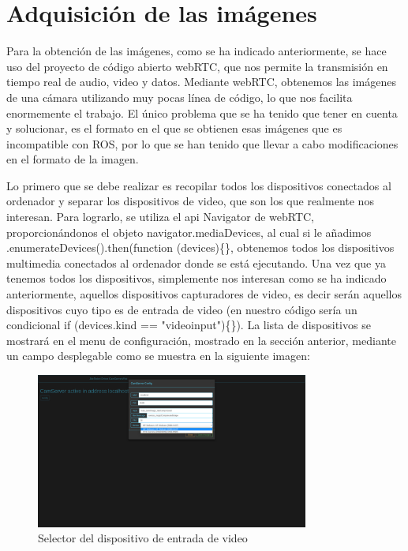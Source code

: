 \section{Adquisición de las imágenes}
Para la obtención de las imágenes, como se ha indicado anteriormente, se hace uso del proyecto de código abierto webRTC, que nos permite la transmisión en tiempo real de audio, video y datos.
Mediante webRTC, obtenemos las imágenes de una cámara utilizando muy pocas línea de código, lo que nos facilita enormemente el trabajo. El único problema que se ha tenido que tener en cuenta y solucionar, es el formato en el que se obtienen esas imágenes que es incompatible con ROS, por lo que se han tenido que llevar a cabo modificaciones en el formato de la imagen.

Lo primero que se debe realizar es recopilar todos los dispositivos conectados al ordenador y separar los dispositivos de video, que son los que realmente nos interesan. Para lograrlo, se utiliza el api Navigator de webRTC, proporcionándonos el objeto navigator.mediaDevices, al cual si le añadimos .enumerateDevices().then(function (devices)\{\}, obtenemos todos los dispositivos multimedia conectados al ordenador donde se está ejecutando. Una vez que ya tenemos todos los dispositivos, simplemente nos interesan como se ha indicado anteriormente, aquellos dispositivos capturadores de video, es decir serán aquellos dispositivos cuyo tipo es de entrada de video (en nuestro código sería un condicional if (devices.kind == "videoinput")\{\}). La lista de dispositivos se mostrará en el menu de configuración, mostrado en la sección anterior, mediante un campo desplegable como se muestra en la siguiente imagen:
 \begin{figure}[H]
  \begin{center}
    \includegraphics[width=0.8\textwidth]{figures/devicecamserver.png}
		\caption{Selector del dispositivo de entrada de video}
		\label{fig.devicecamserver}
		\end{center}
\end{figure}
